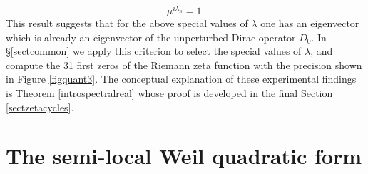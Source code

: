 \documentclass[cupthm]{CUP-JNL-JMJ}
\numberwithin{equation}{section}
\theoremstyle{cupplain}
\theoremstyle{cupdefinition}
\theoremstyle{cupremark}
\theoremstyle{cupproof}
\begin{document}
$$
\mu^{i \lambda_n}=1.
$$
This result suggests that for the above special values of $\lambda$ one has  an eigenvector which is already an eigenvector of the unperturbed Dirac operator $D_0$. In  \S \ref{sectcommon}  we apply this criterion to select the special values of $\lambda$, and compute the 31 first zeros of the Riemann zeta function with the precision shown in Figure \ref{figquant3}. 
The conceptual explanation of these experimental findings  is Theorem \ref{introspectralreal} whose proof is developed  in the final Section \ref{sectzetacycles}. 

\section{The  semi-local Weil quadratic form}\label{riemweilexpl0}
\end{document}
